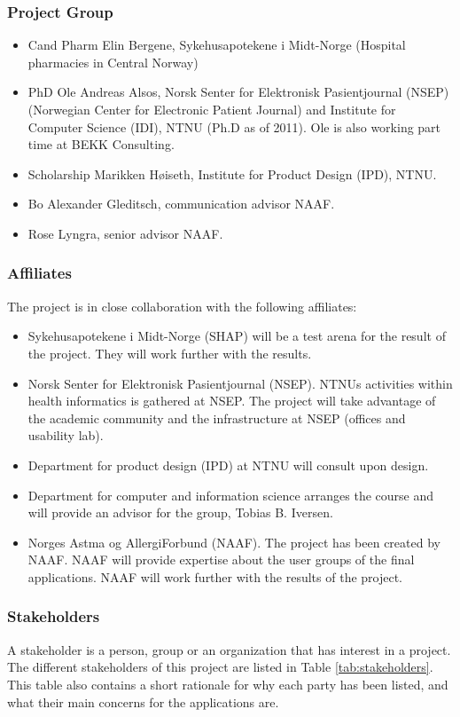 \subsubsection{Project Group}
\begin{itemize}
  	\item Cand Pharm Elin Bergene, Sykehusapotekene i Midt-Norge (Hospital pharmacies in Central Norway)
	\item PhD Ole Andreas Alsos, Norsk Senter for Elektronisk Pasientjournal (NSEP) (Norwegian Center for Electronic Patient Journal) and Institute for Computer Science (IDI), NTNU (Ph.D as of 2011). Ole is also working part time at BEKK Consulting. 
	\item Scholarship Marikken Høiseth, Institute for Product Design (IPD), NTNU.
	\item Bo Alexander Gleditsch, communication advisor NAAF.
	\item Rose Lyngra, senior advisor NAAF.
\end{itemize}

\subsubsection{Affiliates}
The project is in close collaboration with the following affiliates:
\begin{itemize}
  	\item Sykehusapotekene i Midt-Norge (SHAP) will be a test arena for the result of the project. They will work further with the results.
	\item Norsk Senter for Elektronisk Pasientjournal (NSEP). NTNUs activities within health informatics is gathered at NSEP. The project will take advantage of 
the academic community and the infrastructure at NSEP (offices and usability lab).
	\item Department for product design (IPD) at NTNU will consult upon design. 
	\item Department for computer and information science arranges the course and will provide an advisor for the group, Tobias B. Iversen. 
	\item Norges Astma og AllergiForbund (NAAF). The project has been created by NAAF. NAAF will provide expertise about the user groups of the final applications. NAAF will work further with the results of the project. 
\end{itemize}

\subsubsection{Stakeholders}
A stakeholder is a person, group or an organization that has interest in a project. The
different stakeholders of this project are listed in Table \ref{tab:stakeholders}. This table also contains
a short rationale for why each party has been listed, and what their main
concerns for the applications are.

